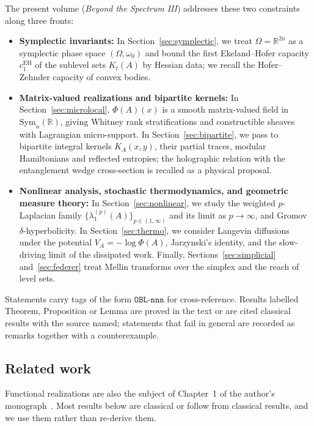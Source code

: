 \documentclass[11pt,a4paper,reqno]{amsart}
\theoremstyle{definition}
\theoremstyle{remark}
\numberwithin{equation}{section}
\begin{document}
The present volume (\emph{Beyond the Spectrum III}) addresses these two constraints along three fronts:
\begin{itemize}
    \item \textbf{Symplectic invariants:} In Section~\ref{sec:symplectic}, we treat $\Omega = \mathbb{R}^{2n}$ as a symplectic phase space $(\Omega, \omega_0)$ and bound the first Ekeland--Hofer capacity $c_1^{\mathrm{EH}}$ of the sublevel sets $K_t(A)$ by Hessian data; we recall the Hofer--Zehnder capacity of convex bodies.
    \item \textbf{Matrix-valued realizations and bipartite kernels:} In Section~\ref{sec:microlocal}, $\Phi(A)(x)$ is a smooth matrix-valued field in $\mathrm{Sym}_n(\mathbb{R})$, giving Whitney rank stratifications and constructible sheaves with Lagrangian micro-support. In Section~\ref{sec:bipartite}, we pass to bipartite integral kernels $K_A(x, y)$, their partial traces, modular Hamiltonians and reflected entropies; the holographic relation with the entanglement wedge cross-section is recalled as a physical proposal.
    \item \textbf{Nonlinear analysis, stochastic thermodynamics, and geometric measure theory:} In Section~\ref{sec:nonlinear}, we study the weighted $p$-Laplacian family $\{\lambda_1^{(p)}(A)\}_{p \in (1,\infty)}$ and its limit as $p\to\infty$, and Gromov $\delta$-hyperbolicity. In Section~\ref{sec:thermo}, we consider Langevin diffusions under the potential $V_A = -\log \Phi(A)$, Jarzynski's identity, and the slow-driving limit of the dissipated work. Finally, Sections~\ref{sec:simplicial} and~\ref{sec:federer} treat Mellin transforms over the simplex and the reach of level sets.
\end{itemize}

Statements carry tags of the form $\mathtt{OBL\text{-}nnn}$ for cross-reference. Results labelled Theorem, Proposition or Lemma are proved in the text or are cited classical results with the source named; statements that fail in general are recorded as remarks together with a counterexample.

\subsection*{Related work}
Functional realizations are also the subject of Chapter~1 of the author's monograph~\cite{silvafilho2026book}. Most results below are classical or follow from classical results, and we use them rather than re-derive them.
\end{document}
